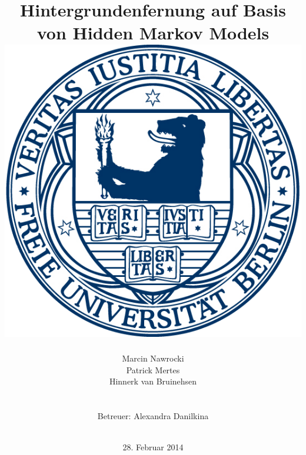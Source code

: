 \documentclass[11pt,a4paper,ngerman,bibtotoc]{scrartcl}
\title{
	\vspace{10mm}
	Hintergrundenfernung auf Basis von Hidden Markov Models\\
	\vspace{10mm}
	\includegraphics{bilder/fu_logo.png}	%
	\vspace{10mm}
}
\author{Marcin Nawrocki\\Patrick Mertes\\Hinnerk van Bruinehsen\\\\\\Betreuer: Alexandra Danilkina\\\\}
\date{28. Februar 2014}
\begin{document}
\maketitle\thispagestyle{empty}
\newpage
\tableofcontents
\newpage







\nocite{lamarre2002tracking}

\newpage
\listoffigures	%

\printbibliography
\end{document}
